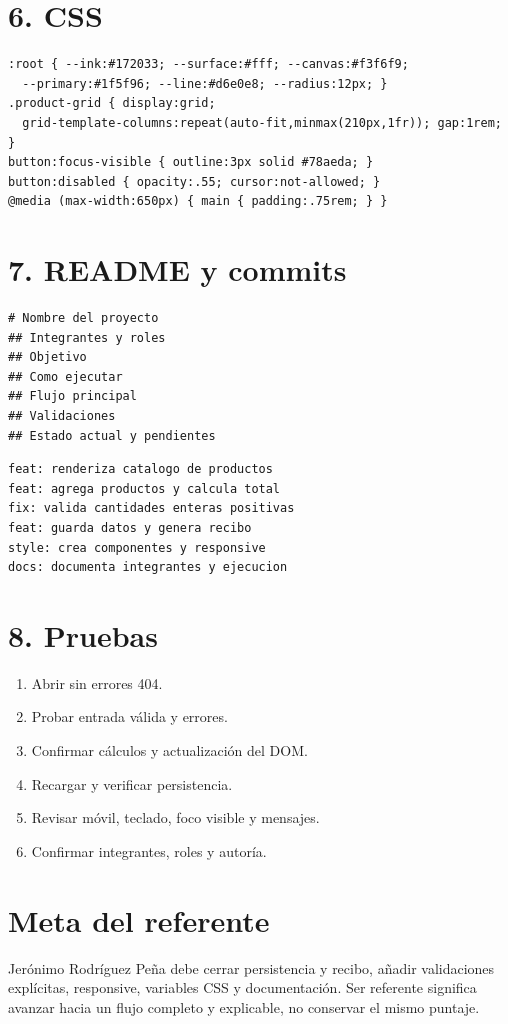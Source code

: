 \documentclass[10pt,a4paper]{article}
\begin{document}
\section*{6. CSS}
\begin{lstlisting}
:root { --ink:#172033; --surface:#fff; --canvas:#f3f6f9;
  --primary:#1f5f96; --line:#d6e0e8; --radius:12px; }
.product-grid { display:grid;
  grid-template-columns:repeat(auto-fit,minmax(210px,1fr)); gap:1rem; }
button:focus-visible { outline:3px solid #78aeda; }
button:disabled { opacity:.55; cursor:not-allowed; }
@media (max-width:650px) { main { padding:.75rem; } }
\end{lstlisting}

\newpage
\section*{7. README y commits}
\begin{lstlisting}
# Nombre del proyecto
## Integrantes y roles
## Objetivo
## Como ejecutar
## Flujo principal
## Validaciones
## Estado actual y pendientes
\end{lstlisting}
\begin{lstlisting}
feat: renderiza catalogo de productos
feat: agrega productos y calcula total
fix: valida cantidades enteras positivas
feat: guarda datos y genera recibo
style: crea componentes y responsive
docs: documenta integrantes y ejecucion
\end{lstlisting}
\section*{8. Pruebas}
\begin{enumerate}
\item Abrir sin errores 404.
\item Probar entrada válida y errores.
\item Confirmar cálculos y actualización del DOM.
\item Recargar y verificar persistencia.
\item Revisar móvil, teclado, foco visible y mensajes.
\item Confirmar integrantes, roles y autoría.
\end{enumerate}
\section*{Meta del referente}
Jerónimo Rodríguez Peña debe cerrar persistencia y recibo, añadir validaciones explícitas, responsive, variables CSS y documentación. Ser referente significa avanzar hacia un flujo completo y explicable, no conservar el mismo puntaje.
\end{document}
